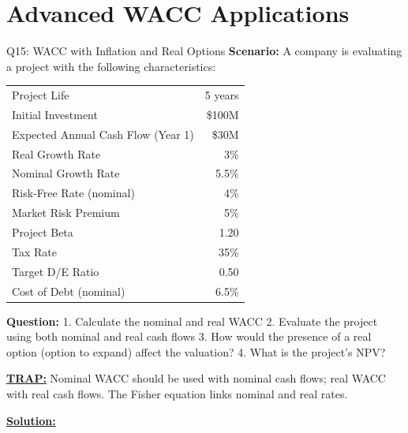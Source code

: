 \documentclass{beamer}
\renewcommand{\scriptsize}{\fontsize{6pt}{7pt}\selectfont}
\begin{document}
	
	\section{Advanced WACC Applications}
	
	\begin{frame}{Q15: WACC with Inflation and Real Options}
		\scriptsize
		\textbf{Scenario:} A company is evaluating a project with the following characteristics:
		
		\begin{tabular}{lr}
			Project Life & 5 years \\
			Initial Investment & \$100M \\
			Expected Annual Cash Flow (Year 1) & \$30M \\
			Real Growth Rate & 3\% \\
			Nominal Growth Rate & 5.5\% \\
			Risk-Free Rate (nominal) & 4\% \\
			Market Risk Premium & 5\% \\
			Project Beta & 1.20 \\
			Tax Rate & 35\% \\
			Target D/E Ratio & 0.50 \\
			Cost of Debt (nominal) & 6.5\% \\
		\end{tabular}
		
		\textbf{Question:}
		1. Calculate the nominal and real WACC
		2. Evaluate the project using both nominal and real cash flows
		3. How would the presence of a real option (option to expand) affect the valuation?
		4. What is the project's NPV?
		
		\vspace{2pt}
		\underline{\textbf{TRAP:}} Nominal WACC should be used with nominal cash flows; real WACC with real cash flows. The Fisher equation links nominal and real rates.
		
		\vspace{4pt}
		\underline{\textbf{Solution:}}
	\end{frame}
	
\end{document}
